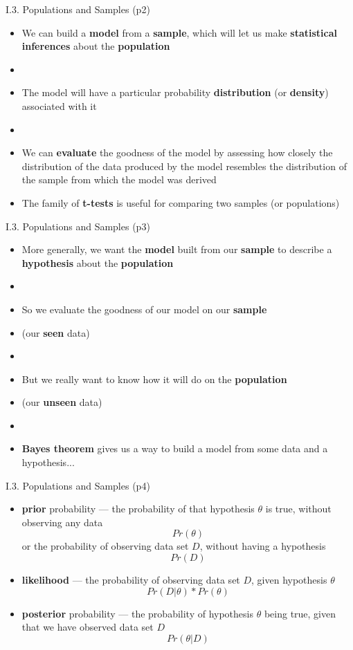 \documentclass[handout]{beamer}
\newcommand{\strong}[1]{\textbf{\color{teal} #1}}
\newcommand{\stronger}[1]{\textbf{\color{purple} #1}}
\begin{document}
\begin{frame}{I.3. Populations and Samples (p2)}
\begin{itemize}
\item We can build a \stronger{model} from a \stronger{sample}, which will let us make \strong{statistical inferences} about the \stronger{population}
\item[]
\item The model will have a particular probability \strong{distribution} (or \strong{density}) associated with it
\item[]
\item We can \strong{evaluate} the goodness of the model by assessing how closely the distribution of the data produced by the model resembles the distribution of the sample from which the model was derived
\item The family of \stronger{t-tests} is useful for comparing two samples (or populations)
\end{itemize}
\end{frame}
\begin{frame}{I.3. Populations and Samples (p3)}
\begin{itemize}
\item More generally, we want the \strong{model} built from our \strong{sample} to describe a \stronger{hypothesis} about the \strong{population}
\item[]
\item So we evaluate the goodness of our model on our \strong{sample}
\item[] (our \textbf{seen} data)
\item[]
\item But we really want to know how it will do on the \strong{population}
\item[] (our \textbf{unseen} data)
\item[]
\item \stronger{Bayes theorem} gives us a way to build a model from some data and a  hypothesis...
\end{itemize}
\end{frame}
\begin{frame}{I.3. Populations and Samples (p4)}
\begin{itemize}
\item \stronger{prior} probability --- the probability of that hypothesis $\theta$ is true, without observing any data
\[
	Pr(\theta)
\]
or the probability of observing data set $D$, without having a hypothesis
\[
	Pr(D)
\]
%
\item \stronger{likelihood} --- the probability of observing data set $D$, given hypothesis $\theta$
\[
	Pr(D|\theta) * Pr(\theta)
\]
%
\item \stronger{posterior} probability --- the probability of hypothesis $\theta$ being true, given that we have observed data set $D$
\[
	Pr(\theta|D)
\]
%
\end{itemize}
\end{frame}
\end{document}
